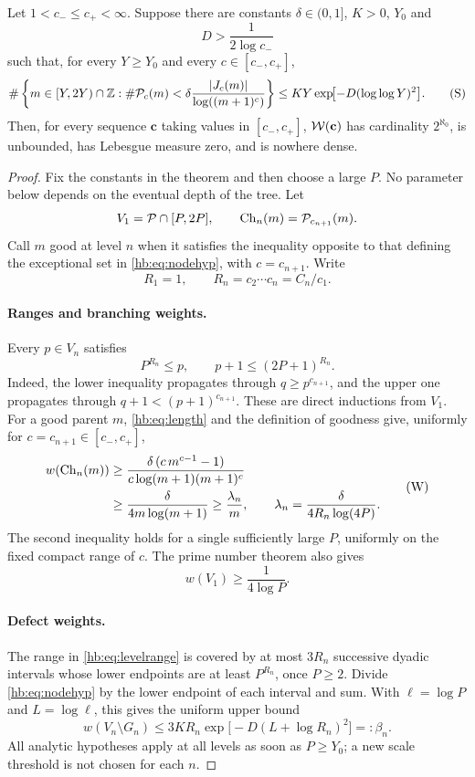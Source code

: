 \begin{theorem}
\label{hb:thm:transfer}
Let $1<c_-\le c_+<\infty$.  Suppose there are constants
$\delta\in(0,1]$, $K>0$, $Y_0$ and
\[
                       D>\frac1{2\log c_-}
 \tag{T}\label{hb:eq:accuracythreshold}
\]
such that, for every $Y\ge Y_0$ and every $c\in[c_-,c_+]$,
\[
 \#\left\{m\in[Y,2Y)\cap\mathbb Z:
  \#\mathcal P_c(m)<\delta\frac{|J_c(m)|}{\log((m+1)^c)}
       \right\}
 \le K Y\exp\!\bigl[-D(\log\log Y)^2\bigr].
 \tag{S}\label{hb:eq:nodehyp}
\]
Then, for every sequence $\mathbf c$ taking values in $[c_-,c_+]$,
$\mathcal W(\mathbf c)$ has cardinality $2^{\aleph_0}$, is unbounded,
has Lebesgue measure zero, and is nowhere dense.
\end{theorem}

\begin{proof}
Fix the constants in the theorem and then choose a large $P$.
No parameter below depends on the eventual depth of the tree.
Let
\[
 V_1=\mathcal P\cap[P,2P],\qquad
 \operatorname{Ch}_n(m)=\mathcal P_{c_{n+1}}(m).
\]
Call $m$ good at level $n$ when it satisfies the inequality
opposite to that defining the exceptional set in
\eqref{hb:eq:nodehyp}, with $c=c_{n+1}$.
Write
\[
 R_1=1,\qquad R_n=c_2\cdots c_n=C_n/c_1.
\]

\paragraph{Ranges and branching weights.}
Every $p\in V_n$ satisfies
\[
 P^{R_n}\le p,\qquad p+1\le(2P+1)^{R_n}.
 \tag{R}\label{hb:eq:levelrange}
\]
Indeed, the lower inequality propagates through
$q\ge p^{c_{n+1}}$, and the upper one propagates through
$q+1<(p+1)^{c_{n+1}}$.  These are direct inductions from $V_1$.
For a good parent $m$, \eqref{hb:eq:length} and the definition
of goodness give, uniformly for $c=c_{n+1}\in[c_-,c_+]$,
\[
 \begin{split}
 w(\operatorname{Ch}_n(m))
 &\ge
 \frac{\delta\,(c\,m^{c-1}-1)}
      {c\log(m+1)(m+1)^c}\\
 &\ge\frac{\delta}{4m\log(m+1)}
 \ge\frac{\lambda_n}{m},
 \qquad
 \lambda_n=\frac{\delta}{4R_n\log(4P)}.
 \end{split}
 \tag{W}\label{hb:eq:localweight}
\]
The second inequality holds for a single sufficiently large $P$,
uniformly on the fixed compact range of $c$.
The prime number theorem also gives
\[
                       w(V_1)\ge\frac1{4\log P}.
 \tag{P}\label{hb:eq:initialmass}
\]

\paragraph{Defect weights.}
The range in \eqref{hb:eq:levelrange} is covered by at most
$3R_n$ successive dyadic intervals whose lower endpoints
are at least $P^{R_n}$, once $P\ge2$.
Divide \eqref{hb:eq:nodehyp} by the lower endpoint of each
interval and sum.  With $\ell=\log P$ and $L=\log\ell$,
this gives the uniform upper bound
\[
 w(V_n\setminus G_n)
 \le 3K R_n\exp\!\bigl[-D(L+\log R_n)^2\bigr]
 =:\beta_n.
 \tag{D}\label{hb:eq:defectweight}
\]
All analytic hypotheses apply at all levels as soon as
$P\ge Y_0$; a new scale threshold is not chosen for each $n$.


\end{proof}
